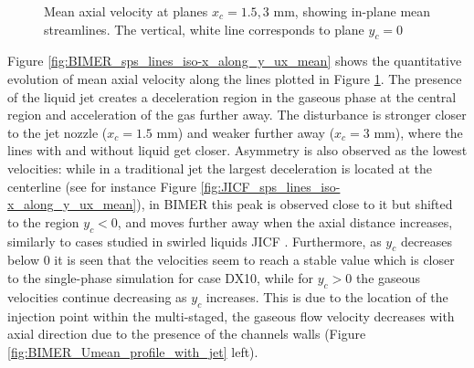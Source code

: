 \begin{figure}[ht]
\centering
\vspace{-0.1in}
\caption[Mean axial velocity at planes $x_c = 1.5, 3$ mm]{Mean axial velocity at planes $x_c = 1.5, 3$ mm, showing in-plane mean streamlines. The vertical, white line corresponds to plane $y_c = 0$}
\label{fig:BIMER_turbulent_structures_planes_x}
\end{figure}

Figure \ref{fig:BIMER_sps_lines_iso-x_along_y_ux_mean} shows the quantitative evolution of mean axial velocity along the lines plotted in Figure \ref{fig:BIMER_turbulent_structures_planes_x}. The presence of the liquid jet creates a deceleration region in the gaseous phase at the central region and acceleration of the gas further away. The disturbance is stronger closer to the jet nozzle ($x_c = 1.5$ mm) and weaker further away ($x_c = 3$ mm), where the lines with and without liquid get closer. Asymmetry is also observed as the lowest velocities: while in a traditional jet the largest deceleration is located at the centerline (see for instance Figure \ref{fig:JICF_sps_lines_iso-x_along_y_ux_mean}), in BIMER this peak is observed close to it but shifted to the region $y_c < 0$, and moves further away when the axial distance increases, similarly to cases studied in swirled liquids JICF . Furthermore, as $y_c$ decreases below $0$ it is seen that the velocities seem to reach a stable value which is closer to the single-phase simulation for case DX10, while for $y_c > 0$ the gaseous velocities continue decreasing as $y_c$ increases. This is due to the location of the injection point within the multi-staged, the gaseous flow velocity decreases with axial direction due to the presence of the channels walls (Figure \ref{fig:BIMER_Umean_profile_with_jet} left).





